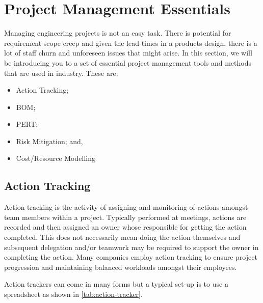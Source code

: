 \section{Project Management Essentials}

Managing engineering projects is not an easy task. There is potential for requirement scope creep and given the lead-times in a products design, there is a lot of staff churn and unforeseen issues that might arise. In this section, we will be introducing you to a set of essential project management tools and methods that are used in industry. These are:

\begin{itemize}
    \item Action Tracking;
    \item \acf{BOM};
    \item \acf{PERT};
    \item Risk Mitigation; and,
    \item Cost/Resource Modelling
\end{itemize}


\subsection{Action Tracking}

Action tracking is the activity of assigning and monitoring of actions amongst team members within a project. Typically performed at meetings, actions are recorded and then assigned an owner whose responsible for getting the action completed. This does not necessarily mean doing the action themselves and subsequent delegation and/or teamwork may be required to support the owner in completing the action. Many companies employ action tracking to ensure project progression and maintaining balanced workloads amongst their employees.

Action trackers can come in many forms but a typical set-up is to use a spreadsheet as shown in \cref{tab:action-tracker}.

\begin{table*}[h]
    \centering
    \caption{Example Action Tracker}
    \label{tab:action-tracker}
\end{table*}

